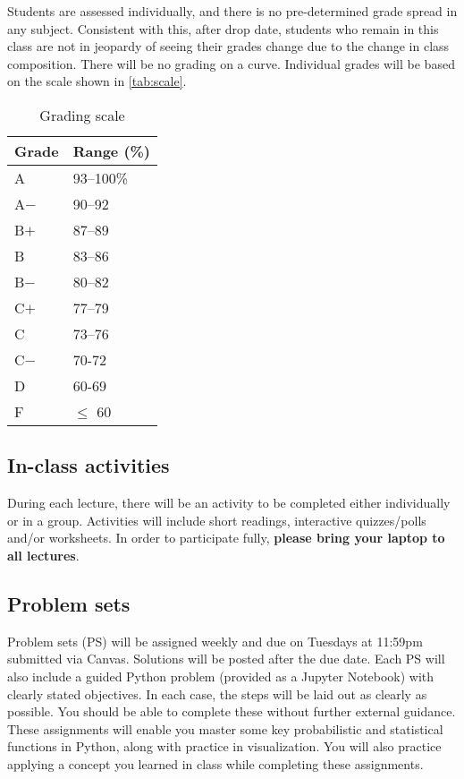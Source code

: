 \documentclass[11pt,twoside]{article}
\numberwithin{equation}{section}
\newcommand{\?}{\stackrel{?}{=}}
\begin{document}
Students are assessed individually, and there is no pre-determined grade spread in any subject.
Consistent with this, after drop date, students who remain in this class are not in jeopardy of seeing their grades change due to the change in class composition.
There will be no grading on a curve. 
Individual grades will be based on the scale shown in \autoref{tab:scale}.

\begin{table}[h!]
   \centering
 \caption{Grading scale}
 \label{tab:scale}
   \begin{tabular}{l l}\toprule
   Grade & Range (\%) \\\midrule
   A & 93--100\%   \\
   A$-$ & 90--92 \\
   B$+$ & 87--89 \\
   B &   83--86 \\
   B$-$ & 80--82 \\
   C$+$  & 77--79\\
   C   & 73--76 \\
   C$-$ & 70-72 \\
   D & 60-69 \\
   F &  $\le$ 60\\\bottomrule
 \end{tabular}
\end{table}

\subsection{In-class activities}
During each lecture, there will be an activity to be completed either individually or in a group. Activities will include short readings, interactive quizzes/polls and/or worksheets.
In order to participate fully, \textbf{please bring your laptop to all lectures}.


\subsection{Problem sets}
Problem sets (PS) will be assigned weekly and due on Tuesdays at 11:59pm submitted via Canvas.
Solutions will be posted after the due date.
Each PS will also include a guided Python problem (provided as a Jupyter Notebook) with clearly stated objectives.  
In each case, the steps will be laid out as clearly as possible.  You should
be able to complete these without further external guidance.  
These assignments will enable you master some key probabilistic and statistical functions in Python, along with practice in visualization. 
You will also practice applying a concept you learned in class while completing these assignments.
\end{document}
